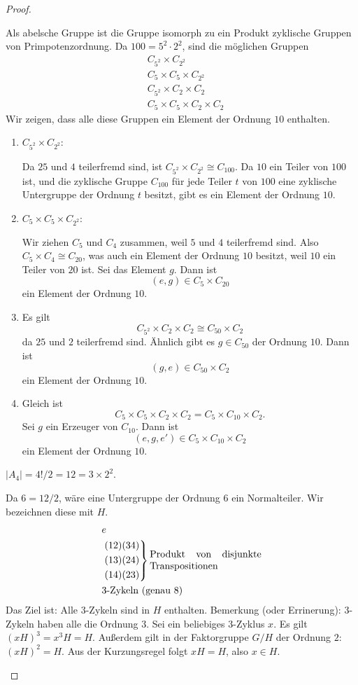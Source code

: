 \begin{proof}
	\begin{parts}
	\item Als abelsche Gruppe ist die Gruppe isomorph zu ein Produkt zyklische Gruppen von Primpotenzordnung. Da $100=5^2\cdot 2^2$, sind die möglichen Gruppen
	\begin{align*}
		&C_{5^2}\times C_{2^2}\\
		&C_5\times C_5 \times C_{2^2}\\
		&C_{5^2}\times C_2\times C_2\\
		&C_5\times C_5\times C_2\times C_2
	\end{align*}
	Wir zeigen, dass alle diese Gruppen ein Element der Ordnung $10$ enthalten.
	\begin{enumerate}[label=(\arabic*)]
		\item $C_{5^2}\times C_{2^2 }$:

			Da $25$ und $4$ teilerfremd sind, ist $C_{5^2}\times C_{2^2}\cong C_{100}$. Da $10$ ein Teiler von $100$ ist, und die zyklische Gruppe $C_{100}$ f\"{u}r jede Teiler $t$ von $100$ eine zyklische Untergruppe der Ordnung $t$ besitzt, gibt es ein Element der Ordnung $10$.
		\item $C_5\times C_5\times C_{2^2}$:

			Wir ziehen $C_5$ und $C_4$ zusammen, weil $5$ und $4$ teilerfremd sind. Also $C_5\times C_4\cong C_{20}$, was auch ein Element der Ordnung $10$ besitzt, weil $10$ ein Teiler von $20$ ist. Sei das Element $g$. Dann ist
			\[
				(e,g)\in C_5\times C_{20}
			\]
			ein Element der Ordnung $10$.
		\item Es gilt
			\[
				C_{5^2}\times C_2\times C_2\cong C_{50}\times C_2
			\]
			da $25$ und $2$ teilerfremd sind. Ähnlich gibt es $g\in C_{50}$ der Ordnung $10$. Dann ist
			\[
				(g, e)\in C_{50}\times C_2
		\]
		ein Element der Ordnung $10$.
	\item Gleich ist
		\[
		C_5\times C_5\times C_2\times C_2=C_5\times C_{10}\times C_2
	.\]
	Sei $g$ ein Erzeuger von $C_{10}$. Dann ist
	\[
		(e, g, e')\in C_5\times C_{10}\times C_2
	\]
	ein Element der Ordnung $10$.
	\end{enumerate}
\item $|A_4|= 4! / 2 = 12=3\times 2^2$.

	Da $6 = 12 / 2$, wäre eine Untergruppe der Ordnung $6$ ein Normalteiler. Wir bezeichnen diese mit $H$. 
	\begin{align*}
		&e\\
		&\left.
			\begin{aligned}
				&(12)(34)\\
				&(13)(24)\\
				&(14)(23)
			\end{aligned}
		\right\}\text{\parbox{4cm}{Produkt von disjunkte Transpositionen}}\\
		&\text{3-Zykeln (genau 8)}
	\end{align*}
	Das Ziel ist: Alle $3$-Zykeln sind in $H$ enthalten. Bemerkung (oder Errinerung): $3$-Zykeln haben alle die Ordnung $3$. Sei ein beliebiges $3$-Zyklus $x$. Es gilt $(xH)^3=x^3H=H$. Außerdem gilt in der Faktorgruppe $G / H$ der Ordnung $2$: $(xH)^{2}=H$. Aus der Kurzungsregel folgt  $xH=H$, also $x\in H$.


\end{parts}
\end{proof}
